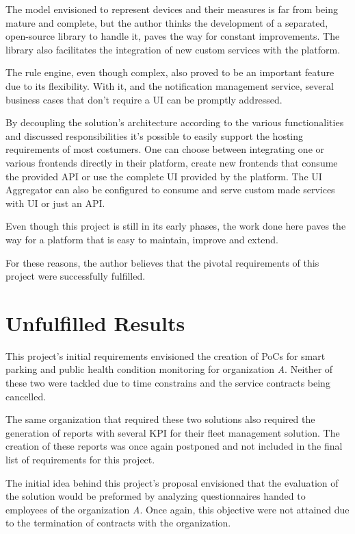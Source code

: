 The model envisioned to represent devices and their measures is far from being mature and complete, but the author thinks the development of a separated, open-source library to handle it, paves the way for constant improvements. The library also facilitates the integration of new custom services with the platform.

The rule engine, even though complex, also proved to be an important feature due to its flexibility. With it, and the notification management service, several business cases that don't require a \gls{UI} can be promptly addressed.

By decoupling the solution's architecture according to the various functionalities and discussed responsibilities it's possible to easily support the hosting requirements of most costumers. One can choose between integrating one or various frontends directly in their platform, create new frontends that consume the provided \gls{API} or use the complete \gls{UI} provided by the platform. The \gls{UI} Aggregator can also be configured to consume and serve custom made services with \gls{UI} or just an \gls{API}.

Even though this project is still in its early phases, the work done here paves the way for a platform that is easy to maintain, improve and extend.

For these reasons, the author believes that the pivotal requirements of this project were successfully fulfilled.

\section{Unfulfilled Results}
\label{sec:conclusion:unfulfilled}

This project's initial requirements envisioned the creation of \gls{PoC}s for smart parking and public health condition monitoring for organization \textit{A}. Neither of these two were tackled due to time constrains and the service contracts being cancelled. 

The same organization that required these two solutions also required the generation of reports with several \gls{KPI} for their fleet management solution. The creation of these reports was once again postponed and not included in the final list of requirements for this project.

The initial idea behind this project's proposal envisioned that the evaluation of the solution would be preformed by analyzing questionnaires handed to employees of the organization \textit{A}. Once again, this objective were not attained due to the termination of contracts with the organization.

